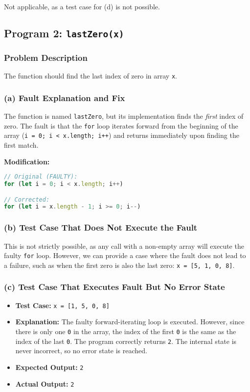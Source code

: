 \documentclass[11pt,a4paper]{article}
\begin{document}
Not applicable, as a test case for (d) is not possible.

\subsection{Program 2: \texttt{lastZero(x)}}

\subsubsection{Problem Description}
The function should find the last index of zero in array \texttt{x}.

\subsubsection{(a) Fault Explanation and Fix}

 The function is named \texttt{lastZero}, but its implementation finds the \textit{first} index of zero. The fault is that the \texttt{for} loop iterates forward from the beginning of the array (\texttt{i = 0; i < x.length; i++}) and returns immediately upon finding the first match.

\textbf{Modification:}
\begin{lstlisting}[language=JavaScript]
// Original (FAULTY):
for (let i = 0; i < x.length; i++)

// Corrected:
for (let i = x.length - 1; i >= 0; i--)
\end{lstlisting}

\subsubsection{(b) Test Case That Does Not Execute the Fault}

This is not strictly possible, as any call with a non-empty array will execute the faulty \texttt{for} loop. However, we can provide a case where the fault does not lead to a failure, such as when the first zero is also the last zero: \texttt{x = [5, 1, 0, 8]}.

\subsubsection{(c) Test Case That Executes Fault But No Error State}

\begin{itemize}[leftmargin=*]
    \item \textbf{Test Case:} \texttt{x = [1, 5, 0, 8]}
    \item \textbf{Explanation:} The faulty forward-iterating loop is executed. However, since there is only one \texttt{0} in the array, the index of the first \texttt{0} is the same as the index of the last \texttt{0}. The program correctly returns \texttt{2}. The internal state is never incorrect, so no error state is reached.
    \item \textbf{Expected Output:} \texttt{2}
    \item \textbf{Actual Output:} \texttt{2}
\end{itemize}
\end{document}
